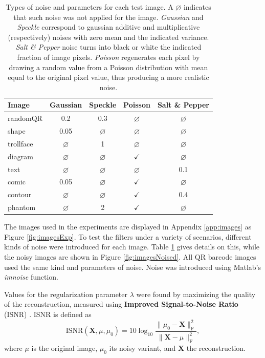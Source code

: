 \documentclass[twoside,11pt]{article}
\newcommand{\mx}{\bm{X}}
\newcommand{\frob}[1]{\|{#1}\|_{\text{F}}}
\def\abovestrut#1{\rule[0in]{0in}{#1}\ignorespaces}
\def\belowstrut#1{\rule[-#1]{0in}{#1}\ignorespaces}
\def\abovespace{\abovestrut{0.20in}}
\def\belowspace{\belowstrut{0.10in}}
\numberwithin{equation}{section}
\numberwithin{theorem}{section}
\begin{document}
\begin{table}[htbp]
\centering
\begin{tabular}{lcccc}
\hline
\abovespace\belowspace
      Image & Gaussian & Speckle & Poisson & Salt \& Pepper \\
\hline
\abovespace
randomQR & 0.2 & 0.3 & $\varnothing$ & $\varnothing$ \\
shape & 0.05 & $\varnothing$ & $\varnothing$ & $\varnothing$ \\
trollface & $\varnothing$ & 1 & $\varnothing$ & $\varnothing$ \\
diagram & $\varnothing$ & $\varnothing$ & $\checkmark$ & $\varnothing$  \\
text & $\varnothing$ & $\varnothing$ & $\varnothing$ & 0.1 \\
comic & 0.05 & $\varnothing$ & $\checkmark$ & $\varnothing$ \\
contour & $\varnothing$ & $\varnothing$ & $\checkmark$ & 0.4 \\
\belowspace
phantom & $\varnothing$ & 2 & $\checkmark$ & $\varnothing$
\\ \hline
\end{tabular}
\caption{\small Types of noise and parameters for each test image. A $\varnothing$ indicates that such noise was not applied for the image. {\it Gaussian} and {\it Speckle} correspond to gaussian additive and multiplicative (respectively) noises with zero mean and the indicated variance. {\it Salt \& Pepper} noise turns into black or white the indicated fraction of image pixels. {\it Poisson} regenerates each pixel by drawing a random value from a Poisson distribution with mean equal to the original pixel value, thus producing a more realistic noise.
\label{tab:noises}
}
\end{table}

The images used in the experiments are displayed in Appendix \ref{app:images} as Figure \ref{fig:imagesExp}. To test the filters under a variety of scenarios, different kinds of noise were introduced for each image. Table \ref{tab:noises} gives details on this, while the noisy images are shown in Figure \ref{fig:imagesNoised}. All QR barcode images used the same kind and parameters of noise. Noise was introduced using Matlab's {\it imnoise} function.

Values for the regularization parameter $\lambda$ were found by maximizing the quality of the reconstruction, measured using {\bf Improved Signal-to-Noise Ratio} (ISNR) \citep{SALSA}. ISNR is defined as
\begin{equation*}
 \text{ISNR}(\mx,\mu,\mu_0) = 10 \log_{10} \frac{\frob{\mu_0 - \mx}^2}{\frob{\mx - \mu}^2} ,
\end{equation*}
where $\mu$ is the original image, $\mu_0$ its noisy variant, and $\mx$ the reconstruction.
\end{document}
